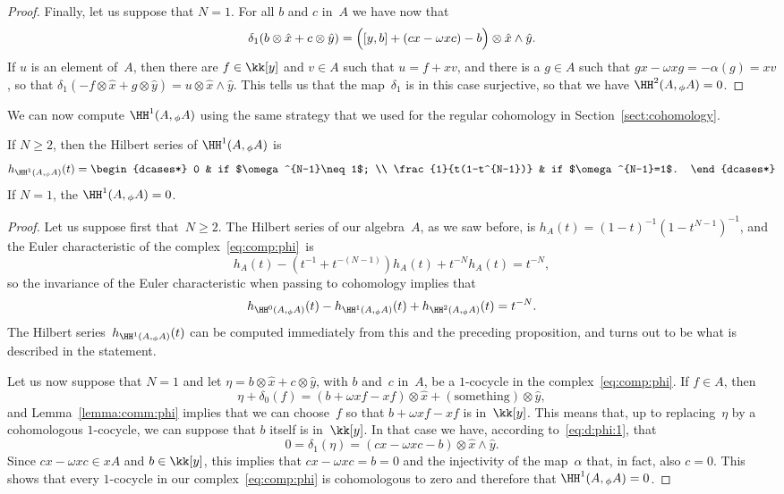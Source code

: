 \begin{proof}
Finally, let us suppose that $N=1$. For all $b$ and $c$ in~$A$ we
have now that
  \[
  \delta_1(b\otimes\hat x+c\otimes\hat y) =
    \Bigl([y,b] + (cx-\omega xc) - b\Bigr)
    \otimes\hat x\wedge\hat y.
  \]
If $u$ is an element of~$A$, then there are $f\in\kk[y]$ and $v\in A$ such
that $u=f+xv$, and there is a $g\in A$ such that $gx-\omega
xg=-\alpha(g)=xv$, so that
  \(
  \delta_1(-f\otimes\hat x+g\otimes\hat y) = u\otimes\hat x\wedge\hat y
  \).
This tells us that the map~$\delta_1$ is in this case surjective, so that
we have $\HH^2(A,{}_\phi A)=0$.
\end{proof}

We can now compute $\HH^1(A,{}_\phi A)$ using the same strategy that
we used for the regular cohomology in Section~\ref{sect:cohomology}.

\begin{Proposition}\label{prop:h1:phi}
If $N\geq2$, then the Hilbert series of $\HH^1(A,{}_\phi A)$ is
  \[
  h_{\HH^1(A,{}_\phi A)}(t)
        = \begin{dcases*}
          0 & if $\omega^{N-1}\neq1$; \\ 
          \frac{1}{t(1-t^{N-1})} & if $\omega^{N-1}=1$.
          \end{dcases*}
  \]
If $N=1$, the $\HH^1(A,{}_\phi A)=0$.
\end{Proposition}

\begin{proof}
Let us suppose first that~$N\geq2$.
The Hilbert series of our algebra~$A$, as we saw before, is
  \(
  h_A(t) = (1-t)^{-1}(1-t^{N-1})^{-1}
  \),
and the Euler characteristic of the complex~\eqref{eq:comp:phi}~is
  \[
  h_A(t) - (t^{-1}+t^{-(N-1)})h_A(t)+t^{-N}h_A(t) = t^{-N},
  \]
so the invariance of the Euler characteristic when passing to cohomology
implies that
  \[
  h_{\HH^0(A,{}_\phi A)}(t)
  -h_{\HH^1(A,{}_\phi A)}(t)
  +h_{\HH^2(A,{}_\phi A)}(t)
  = t^{-N}.
  \]
The Hilbert series~$h_{\HH^1(A,{}_\phi A)}(t)$ can be computed immediately
from this and the preceding proposition, and turns out to be what is
described in the statement.

Let us now suppose that $N=1$ and let $\eta=b\otimes\hat x+c\otimes\hat y$,
with $b$ and~$c$ in~$A$, be a $1$-cocycle in the
complex~\eqref{eq:comp:phi}. If $f\in A$, then 
  \[
  \eta+\delta_0(f) = (b+\omega xf-xf)\otimes\hat x +
  (\text{something})\otimes\hat y,
  \]
and Lemma~\ref{lemma:comm:phi} implies that we can choose~$f$ so that
$b+\omega xf-xf$ is in~$\kk[y]$. This means that, up to replacing~$\eta$ by
a cohomologous $1$-cocycle, we can suppose that $b$ itself is in~$\kk[y]$.
In that case we have, according to~\eqref{eq:d:phi:1}, that
  \[
  0 = \delta_1(\eta) = 
    (cx-\omega xc - b) \otimes\hat x\wedge\hat y.
  \]
Since $cx-\omega xc\in xA$ and $b\in\kk[y]$, this implies that $cx-\omega
xc=b=0$ and the injectivity of the map~$\alpha$ that, in fact, also $c=0$.
This shows that every $1$-cocycle in our complex~\eqref{eq:comp:phi} is
cohomologous to zero and therefore that $\HH^1(A,{}_\phi A)=0$.
\end{proof}

